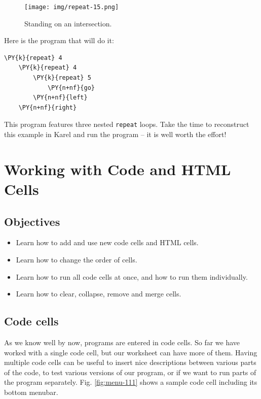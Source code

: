 \begin{figure}[!ht]
\begin{center}
\texttt{[image: img/repeat-15.png]}
\vspace{-0mm}
\caption{Standing on an intersection.}
\label{fig:repeat-15}
\end{center}
\end{figure}
\noindent
Here is the program that will do it:\\

\begin{bbox}
\begin{Verbatim}[commandchars=\\\{\}]
\PY{k}{repeat} 4
    \PY{k}{repeat} 4
        \PY{k}{repeat} 5
            \PY{n+nf}{go}
        \PY{n+nf}{left}
    \PY{n+nf}{right}
\end{Verbatim}
\end{bbox}
\vspace{6mm}

\noindent
This program features three nested {\tt repeat} loops. Take the time to 
reconstruct this example in Karel and run the program -- it is well worth the effort!

\section{Working with Code and HTML Cells} \label{sec:editmenu}

\subsection{Objectives} 
 
\begin{itemize}
\item Learn how to add and use new code cells and HTML cells.
\item Learn how to change the order of cells.
\item Learn how to run all code cells at once, and how to run them individually.
\item Learn how to clear, collapse, remove and merge cells.
\end{itemize}

\subsection{Code cells}

As we know well by now, programs are entered in code cells. So far we have worked with 
a single code cell, but our worksheet can have more of them. 
Having multiple code cells can be useful to insert nice descriptions 
between various parts of the code, to test various versions 
of our program, or if we want to run parts of the program separately. Fig. 
\ref{fig:menu-111} shows a sample code cell including its bottom menubar. 

